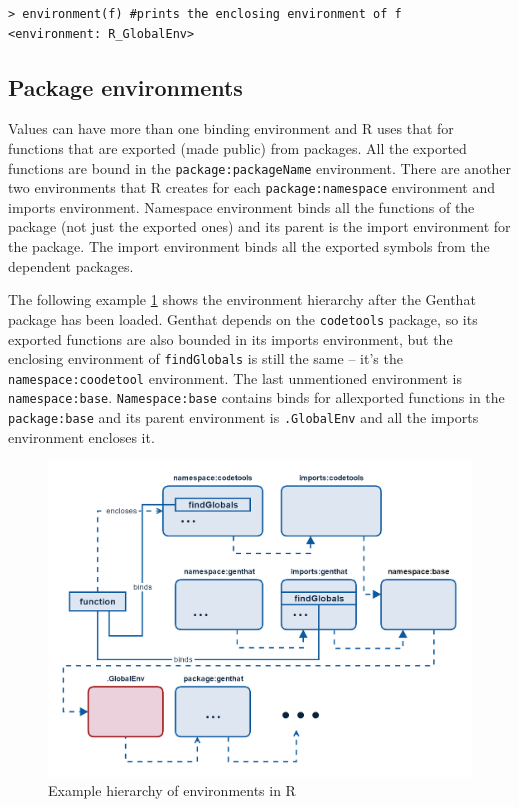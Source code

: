 \documentclass[thesis=B,english]{FITthesis}[2012/10/20]
\begin{document}
\begin{verbatim}
> environment(f) #prints the enclosing environment of f
<environment: R_GlobalEnv>
\end{verbatim}

\subsection{Package environments}

Values can have more than one binding environment and R uses that for functions that are exported (made public) from packages. All the exported functions are bound in the \verb|package:packageName| environment. There are another two environments that R creates for each \verb|package:namespace| environment and imports environment. Namespace environment binds all the functions of the package (not just the exported ones) and its parent is the import environment for the package. The import environment binds all the exported symbols from the dependent packages.

The following example \ref{fig:hierarchy} shows the environment hierarchy after the Genthat package has been loaded. Genthat depends on the \texttt{codetools} package\cite{codetools}, so its exported functions are also bounded in its imports environment, but the enclosing environment of \texttt{findGlobals} is still the same – it’s the \texttt{namespace:coodetool} environment. The last unmentioned environment is \texttt{namespace:base}. \texttt{Namespace:base} contains binds for allexported functions in the \texttt{package:base} and its parent environment is \texttt{.GlobalEnv} and all the imports environment encloses it.

\begin{figure}\centering
    \includegraphics[width=\textwidth]{img/hierarchy.png}
	\caption[]{Example hierarchy of environments in R}\label{fig:hierarchy}
\end{figure}
\end{document}
